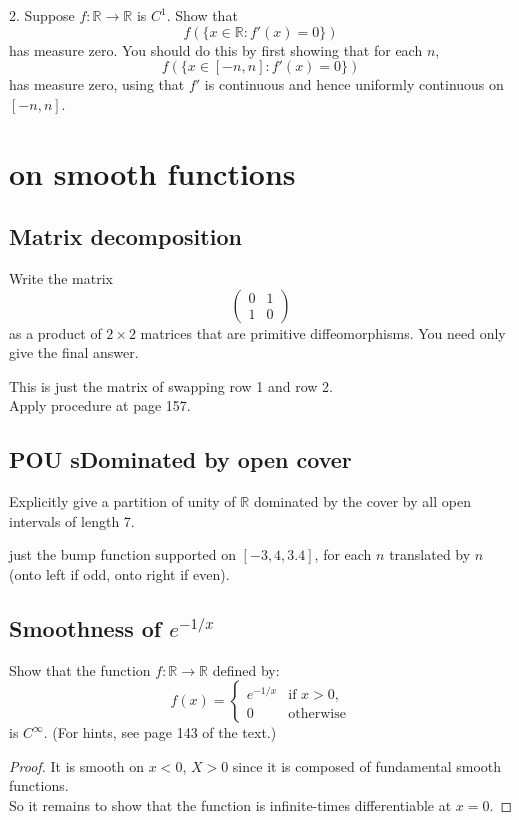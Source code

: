 \documentclass[lang=cn,11pt]{template}
\begin{document}
2. Suppose \( f : \mathbb{R} \rightarrow \mathbb{R} \) is \( C^1 \). Show that
   \[
   f(\{x \in \mathbb{R} : f'(x) = 0\})
   \]
   has measure zero. You should do this by first showing that for each \( n \),
   \[
   f(\{x \in [-n, n] : f'(x) = 0\})
   \]
   has measure zero, using that \( f' \) is continuous and hence uniformly continuous on \( [-n, n] \).





\chapter{on smooth functions}

\section{Matrix decomposition}
Write the matrix 
\[
\begin{pmatrix}
0 & 1 \\
1 & 0
\end{pmatrix}
\]
as a product of \(2 \times 2\) matrices that are primitive diffeomorphisms. You need only give the final answer.
\begin{solution}
    This is just the matrix of swapping row 1 and row 2.\\ Apply procedure at page 157.
\end{solution}


\section{POU sDominated by open cover}
Explicitly give a partition of unity of \( \mathbb{R} \) dominated by the cover by all open intervals of length 7.
\begin{solution}
    just the bump function supported on $[-3,4, 3.4]$, for each $n$ translated by $n$ (onto left if odd, onto right if even).
\end{solution}

\section{Smoothness of $e^{-1/x}$}
Show that the function \( f : \mathbb{R} \to \mathbb{R} \) defined by:
\[
f(x) =
\begin{cases} 
e^{-1/x} & \text{if } x > 0, \\
0 & \text{otherwise}
\end{cases}
\]
is \( C^\infty \). (For hints, see page 143 of the text.)
\begin{proof}
It is smooth on $x<0$, $X>0$ since it is composed of fundamental smooth functions.\\
So it remains to show that the function is infinite-times differentiable at $x = 0$.
\end{proof}
\end{document}
